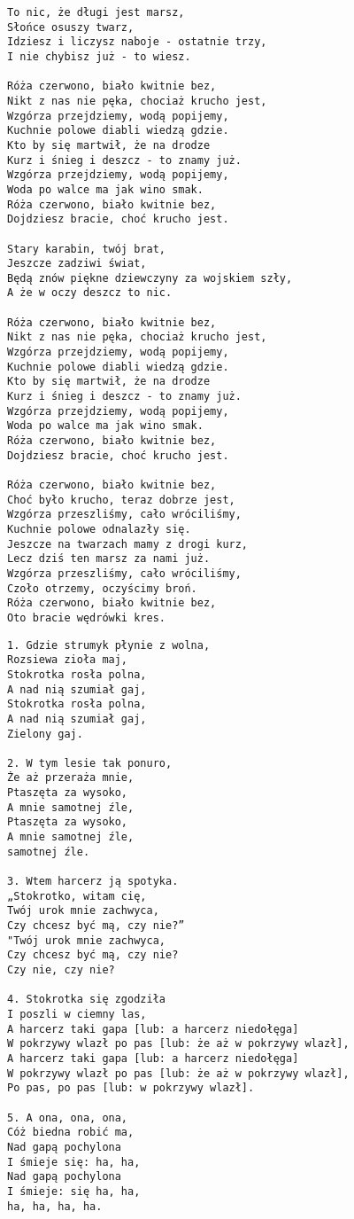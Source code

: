 \documentclass[12pt]{article}
\begin{document}
\begin{verbatim}
To nic, że długi jest marsz,
Słońce osuszy twarz,
Idziesz i liczysz naboje - ostatnie trzy,
I nie chybisz już - to wiesz.

Róża czerwono, biało kwitnie bez,
Nikt z nas nie pęka, chociaż krucho jest,
Wzgórza przejdziemy, wodą popijemy,
Kuchnie polowe diabli wiedzą gdzie.
Kto by się martwił, że na drodze
Kurz i śnieg i deszcz - to znamy już.
Wzgórza przejdziemy, wodą popijemy,
Woda po walce ma jak wino smak.
Róża czerwono, biało kwitnie bez,
Dojdziesz bracie, choć krucho jest.

Stary karabin, twój brat,
Jeszcze zadziwi świat,
Będą znów piękne dziewczyny za wojskiem szły,
A że w oczy deszcz to nic.

Róża czerwono, biało kwitnie bez,
Nikt z nas nie pęka, chociaż krucho jest,
Wzgórza przejdziemy, wodą popijemy,
Kuchnie polowe diabli wiedzą gdzie.
Kto by się martwił, że na drodze
Kurz i śnieg i deszcz - to znamy już.
Wzgórza przejdziemy, wodą popijemy,
Woda po walce ma jak wino smak.
Róża czerwono, biało kwitnie bez,
Dojdziesz bracie, choć krucho jest.

Róża czerwono, biało kwitnie bez,
Choć było krucho, teraz dobrze jest,
Wzgórza przeszliśmy, cało wróciliśmy,
Kuchnie polowe odnalazły się.
Jeszcze na twarzach mamy z drogi kurz,
Lecz dziś ten marsz za nami już.
Wzgórza przeszliśmy, cało wróciliśmy,
Czoło otrzemy, oczyścimy broń.
Róża czerwono, biało kwitnie bez,
Oto bracie wędrówki kres.
\end{verbatim}
\clearpage

\begin{verbatim}
1. Gdzie strumyk płynie z wolna,
Rozsiewa zioła maj,
Stokrotka rosła polna,
A nad nią szumiał gaj,
Stokrotka rosła polna,
A nad nią szumiał gaj,
Zielony gaj.

2. W tym lesie tak ponuro,
Że aż przeraża mnie,
Ptaszęta za wysoko,
A mnie samotnej źle,
Ptaszęta za wysoko,
A mnie samotnej źle,
samotnej źle.

3. Wtem harcerz ją spotyka.
„Stokrotko, witam cię,
Twój urok mnie zachwyca,
Czy chcesz być mą, czy nie?”
"Twój urok mnie zachwyca,
Czy chcesz być mą, czy nie?
Czy nie, czy nie?

4. Stokrotka się zgodziła
I poszli w ciemny las,
A harcerz taki gapa [lub: a harcerz niedołęga]
W pokrzywy wlazł po pas [lub: że aż w pokrzywy wlazł],
A harcerz taki gapa [lub: a harcerz niedołęga]
W pokrzywy wlazł po pas [lub: że aż w pokrzywy wlazł],
Po pas, po pas [lub: w pokrzywy wlazł].

5. A ona, ona, ona,
Cóż biedna robić ma,
Nad gapą pochylona
I śmieje się: ha, ha,
Nad gapą pochylona
I śmieje: się ha, ha,
ha, ha, ha, ha.
\end{verbatim}
\clearpage
\end{document}
